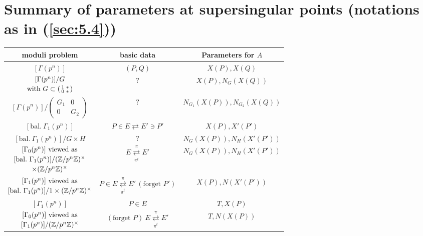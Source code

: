 \section{Summary of parameters at supersingular points (notations as in (\ref{sec:5.4}))}
\label{sec:7.7}

\begin{center}
{\scriptsize\setlength{\tabcolsep}{2pt}%
\begin{tabular}{@{}c|c|c@{}}
\hline
moduli problem & basic data & Parameters for $A$ \\
\hline
$[\Gamma(p^n)]$ & $(P, Q)$ & $X(P), X(Q)$ \\
\hline
$\begin{array}{@{}c@{}} {[\Gamma(p^n)]/G} \\[2pt] \text{with } G \subset \left(\begin{smallmatrix} 1 & * \\ 0 & * \end{smallmatrix}\right) \end{array}$ & $?$ & $X(P), N_G(X(Q))$ \\
\hline
$[\Gamma(p^n)]\big/\left(\begin{smallmatrix} G_1 & 0 \\ 0 & G_2 \end{smallmatrix}\right)$ & $?$ & $N_{G_1}(X(P)), N_{G_2}(X(Q))$ \\
\hline
$[\mathrm{bal.}\ \Gamma_1(p^n)]$ & $P \in E \rightleftarrows E' \ni P'$ & $X(P), X'(P')$ \\
\hline
$[\mathrm{bal.}\ \Gamma_1(p^n)]/G \times H$ & $?$ & $N_G(X(P)), N_H(X'(P'))$ \\
\hline
$\begin{array}{@{}c@{}} {[\Gamma_0(p^n)]} \text{ viewed as} \\[2pt] {[\mathrm{bal.}\ \Gamma_1(p^n)]/(\Z/p^n\Z)^\times} \\[2pt] {\times (\Z/p^n\Z)^\times} \end{array}$ & $E \underset{\pi^t}{\overset{\pi}{\rightleftarrows}} E'$ & $N_G(X(P)), N_H(X'(P'))$ \\
\hline
$\begin{array}{@{}c@{}} {[\Gamma_1(p^n)]} \text{ viewed as} \\[2pt] {[\mathrm{bal.}\ \Gamma_1(p^n)]/1 \times (\Z/p^n\Z)^\times} \end{array}$ & $P \in E \underset{\pi^t}{\overset{\pi}{\rightleftarrows}} E'\,(\text{forget } P')$ & $X(P), N(X'(P'))$ \\
\hline
$[\Gamma_1(p^n)]$ & $P \in E$ & $T, X(P)$ \\
\hline
$\begin{array}{@{}c@{}} {[\Gamma_0(p^n)]} \text{ viewed as} \\[2pt] {[\Gamma_1(p^n)]/(\Z/p^n\Z)^\times} \end{array}$ & $(\text{forget } P)\ E \underset{\pi^t}{\overset{\pi}{\rightleftarrows}} E'$ & $T, N(X(P))$ \\
\hline
\end{tabular}}
\end{center}

